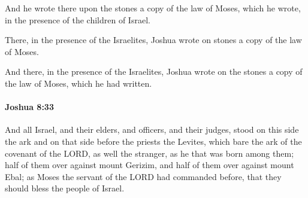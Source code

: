 			\begin{versebox}
					\item[BHS] 
					\item[ASV] And he wrote there upon the stones a copy of the law of Moses, which he wrote, in the presence of the children of Israel.
					\item[NIV] There, in the presence of the Israelites, Joshua wrote on stones a copy of the law of Moses.
					\item[NRSV] And there, in the presence of the Israelites, Joshua wrote on the stones a copy of the law of Moses, which he had written.
			\end{versebox}

		\paragraph{Joshua 8:33} %
			\label{JOSHUA-8-33}

			And all Israel, and their elders, and officers, and their judges, stood on this side the ark and on that side before the priests the Levites, which bare the ark of the covenant of the LORD, as well the stranger, as he that was born among them; half of them over against mount Gerizim, and half of them over against mount Ebal; as Moses the servant of the LORD had commanded before, that they should bless the people of Israel.

